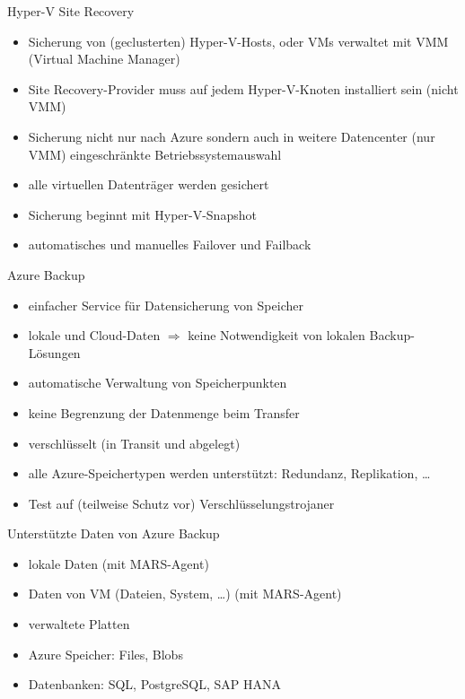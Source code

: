 \begin{flashcard}[Definition]{Hyper-V Site Recovery}
  \begin{itemize}
    \item Sicherung von (geclusterten) Hyper-V-Hosts,\newline
      oder VMs verwaltet mit VMM (Virtual Machine Manager)
    \item Site Recovery-Provider muss auf jedem Hyper-V-Knoten installiert sein (nicht VMM)
    \item Sicherung nicht nur nach Azure sondern auch in weitere Datencenter (nur VMM)\newline
      eingeschränkte Betriebssystemauswahl
    \item alle virtuellen Datenträger werden gesichert
    \item Sicherung beginnt mit Hyper-V-Snapshot
    \item automatisches und manuelles Failover und Failback
  \end{itemize}
\end{flashcard}

\begin{flashcard}[Definition]{Azure Backup}
  \begin{itemize}
    \item einfacher Service für Datensicherung von Speicher
    \item lokale und Cloud-Daten\newline
      $\Rightarrow$ keine Notwendigkeit von lokalen Backup-Lösungen
    \item automatische Verwaltung von Speicherpunkten
    \item keine Begrenzung der Datenmenge beim Transfer
    \item verschlüsselt (in Transit und abgelegt)
    \item alle Azure-Speichertypen werden unterstützt: Redundanz, Replikation, \ldots
    \item Test auf (teilweise Schutz vor) Verschlüsselungstrojaner
  \end{itemize}
\end{flashcard}

\begin{flashcard}[Definition]{Unterstützte Daten von Azure Backup}
  \begin{itemize}
    \item lokale Daten (mit MARS-Agent)
    \item Daten von VM (Dateien, System, \ldots) (mit MARS-Agent)
    \item verwaltete Platten
    \item Azure Speicher: Files, Blobs
    \item Datenbanken: SQL, PostgreSQL, SAP HANA
  \end{itemize}
\end{flashcard}

